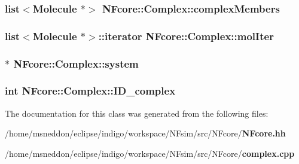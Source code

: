 \subsubsection{\setlength{\rightskip}{0pt plus 5cm}list$<${\bf Molecule} $\ast$$>$ {\bf NFcore::Complex::complexMembers}}\label{classNFcore_1_1Complex_eb6d1fcb66f1c7ae39edb701f1443024}


\subsubsection{\setlength{\rightskip}{0pt plus 5cm}list$<${\bf Molecule} $\ast$$>$::iterator {\bf NFcore::Complex::molIter}}\label{classNFcore_1_1Complex_2551a54dfa379df3bc200b729e3e35bf}


\subsubsection{$\ast$ {\bf NFcore::Complex::system}\hspace{0.3cm}{\tt  [protected]}}\label{classNFcore_1_1Complex_507911a7d8e341fe531173a178011cc3}


\subsubsection{\setlength{\rightskip}{0pt plus 5cm}int {\bf NFcore::Complex::ID\_\-complex}\hspace{0.3cm}{\tt  [protected]}}\label{classNFcore_1_1Complex_fa83ffe4d89fe79396145cf245960d9d}




The documentation for this class was generated from the following files:\begin{CompactItemize}
\item 
/home/msneddon/eclipse/indigo/workspace/NFsim/src/NFcore/{\bf NFcore.hh}\item 
/home/msneddon/eclipse/indigo/workspace/NFsim/src/NFcore/{\bf complex.cpp}\end{CompactItemize}
